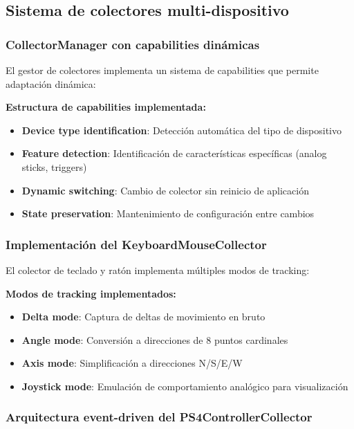 \subsection{Sistema de colectores multi-dispositivo}
\label{subsec:colectores_multi_dispositivo}

\subsubsection{CollectorManager con capabilities dinámicas}

El gestor de colectores implementa un sistema de capabilities que permite adaptación dinámica:

\textbf{Estructura de capabilities implementada:}
\begin{itemize}
    \item \textbf{Device type identification}: Detección automática del tipo de dispositivo
    \item \textbf{Feature detection}: Identificación de características específicas (analog sticks, triggers)
    \item \textbf{Dynamic switching}: Cambio de colector sin reinicio de aplicación
    \item \textbf{State preservation}: Mantenimiento de configuración entre cambios
\end{itemize}

\subsubsection{Implementación del KeyboardMouseCollector}

El colector de teclado y ratón implementa múltiples modos de tracking:

\textbf{Modos de tracking implementados:}
\begin{itemize}
    \item \textbf{Delta mode}: Captura de deltas de movimiento en bruto
    \item \textbf{Angle mode}: Conversión a direcciones de 8 puntos cardinales
    \item \textbf{Axis mode}: Simplificación a direcciones N/S/E/W
    \item \textbf{Joystick mode}: Emulación de comportamiento analógico para visualización
\end{itemize}

\subsubsection{Arquitectura event-driven del PS4ControllerCollector}

